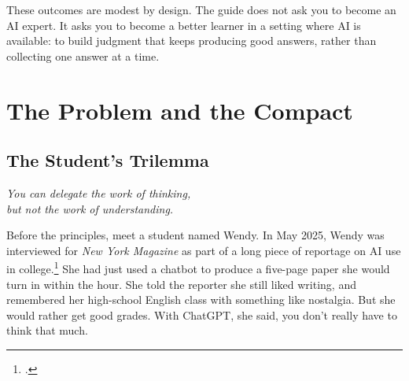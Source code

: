 \documentclass{SIAMbook2023}
\newcommand{\bookepigraph}[1]{%
  \begin{center}%
    \begin{minipage}{0.78\textwidth}%
      \centering\itshape #1%
    \end{minipage}%
  \end{center}%
  \vspace{0.6em}%
}
\begin{document}
These outcomes are modest by design. The guide does not ask you to become an AI expert. It asks you to become a better learner in a setting where AI is available: to build judgment that keeps producing good answers, rather than collecting one answer at a time.

\chapter{The Problem and the Compact}
\label{ch:the-problem-and-the-compact}%

\section{The Student's Trilemma}
\label{sec:trilemma}

\bookepigraph{You can delegate the work of thinking,\\but not the work of understanding.}

Before the principles, meet a student named Wendy. In May 2025, Wendy was interviewed for \emph{New York Magazine} as part of a long piece of reportage on AI use in college.\footnote{\citet{walsh2025everyone}.} She had just used a chatbot to produce a five-page paper she would turn in within the hour. She told the reporter she still liked writing, and remembered her high-school English class with something like nostalgia. But she would rather get good grades. With ChatGPT, she said, you don't really have to think that much.
\end{document}
